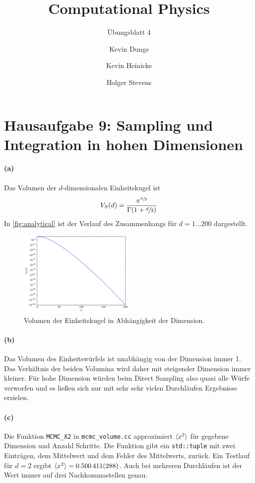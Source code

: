 \documentclass{scrartcl}
\author{Kevin Dungs \and Kevin Heinicke \and Holger Stevens}
\title{Computational Physics}
\subtitle{Übungsblatt 4}
\DeclarePairedDelimiter{\mean}{\langle}{\rangle}
\begin{document}
\maketitle

\section*{Hausaufgabe 9: Sampling und Integration in hohen Dimensionen}
\paragraph{(a)} Das Volumen der $d$-dimensionalen Einheitskugel ist
\begin{equation}
    V_S(d) = \frac{\pi^{\sfrac{d}{2}}}{\Gamma(1 + \sfrac{d}{2})}
\end{equation}
In \autoref{fig:analytical} ist der Verlauf des Zusammenhangs für $d=1\dots200$ dargestellt.

\begin{figure}[H]
    \centering
    \includegraphics[width=0.5\textwidth]{plots/analytical.pdf}
    \caption{Volumen der Einheitskugel in Abhängigkeit der Dimension.}
    \label{fig:analytical}
\end{figure}

\paragraph{(b)} Das Volumen des Einheitswürfels ist unabhängig von der Dimension immer \num{1}. Das Verhältnis der beiden Volumina wird daher mit steigender Dimension immer kleiner. Für hohe Dimension würden beim Direct Sampling also quasi alle Würfe verworfen und es ließen sich nur mit sehr sehr vielen Durchläufen Ergebnisse erzielen.

\paragraph{(c)} Die Funktion \texttt{MCMC\_X2} in \texttt{mcmc\_volume.cc} approximiert $\mean{x^2}$ für gegebene Dimension und Anzahl Schritte. Die Funktion gibt ein \texttt{std::tuple} mit zwei Einträgen, dem Mittelwert und dem Fehler des Mittelwerts, zurück. Ein Testlauf für $d=2$ ergibt $\mean{x^2} = \num{0.500411 \pm 0.000288}$. Auch bei mehreren Durchläufen ist der Wert immer auf drei Nachkommastellen genau.
\end{document}
